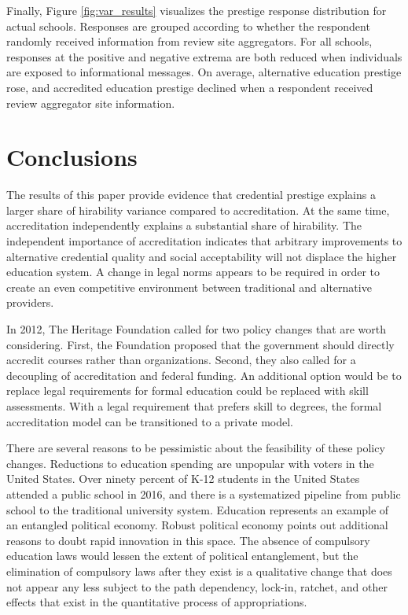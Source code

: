 \documentclass[review]{elsarticle}
\begin{document}
Finally, Figure \ref{fig:var_results} visualizes the prestige response distribution
for actual schools.
Responses are grouped according to whether the respondent randomly received information
from review site aggregators.
For all schools, responses at the positive and negative extrema are both reduced
when individuals are exposed to informational messages.
On average, alternative education prestige rose,
and accredited education prestige declined when a respondent received review aggregator site information.

\section{Conclusions}

The results of this paper provide evidence that credential prestige explains a larger share
of hirability variance compared to accreditation.
At the same time, accreditation independently explains a substantial share of hirability.
The independent importance of accreditation indicates that arbitrary improvements to alternative credential
quality and social acceptability will not displace the higher education system.
A change in legal norms appears to be required in order to create an even competitive environment between traditional and alternative providers.

In 2012, The Heritage Foundation called for two policy changes that are worth considering.
First, the Foundation proposed that the government should directly accredit courses rather than organizations\cite{burke2012accreditation}.
Second, they also called for a decoupling of accreditation and federal funding.
An additional option would be to replace legal requirements for formal education could be replaced with skill assessments.
With a legal requirement that prefers skill to degrees, the formal accreditation model can be transitioned to a private model.

There are several reasons to be pessimistic about the feasibility of these policy changes.
Reductions to education spending are unpopular with voters in the United States.
Over ninety percent of K-12 students in the United States attended a public school in 2016\cite{us2019digest},
and there is a systematized pipeline from public school to the traditional university system.
Education represents an example of an entangled political economy\cite{wagner2014entangled}.
Robust political economy points out additional reasons to doubt rapid innovation in this space\cite{boettke2004liberalism}.
The absence of compulsory education laws would lessen the extent of political entanglement,
but the elimination of compulsory laws after they exist is a qualitative change that does not appear
any less subject to the path dependency, lock-in, ratchet, and other effects that exist in the quantitative process of appropriations.
\end{document}
